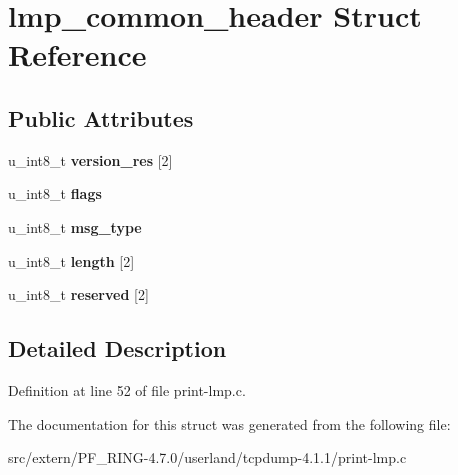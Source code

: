 \hypertarget{structlmp__common__header}{
\section{lmp\_\-common\_\-header Struct Reference}
\label{structlmp__common__header}
}
\subsection*{Public Attributes}
\begin{DoxyCompactItemize}
\item 
\hypertarget{structlmp__common__header_acb55bc0dc1d9bd10a6d7f7069c54d67e}{
u\_\-int8\_\-t {\bfseries version\_\-res} \mbox{[}2\mbox{]}}
\label{structlmp__common__header_acb55bc0dc1d9bd10a6d7f7069c54d67e}

\item 
\hypertarget{structlmp__common__header_a672053ea855df8ec17ee91e867cd74e0}{
u\_\-int8\_\-t {\bfseries flags}}
\label{structlmp__common__header_a672053ea855df8ec17ee91e867cd74e0}

\item 
\hypertarget{structlmp__common__header_ae14d97792028694c6b10624fd1d1ad94}{
u\_\-int8\_\-t {\bfseries msg\_\-type}}
\label{structlmp__common__header_ae14d97792028694c6b10624fd1d1ad94}

\item 
\hypertarget{structlmp__common__header_a8296b9548625654fc59a4c48566d6590}{
u\_\-int8\_\-t {\bfseries length} \mbox{[}2\mbox{]}}
\label{structlmp__common__header_a8296b9548625654fc59a4c48566d6590}

\item 
\hypertarget{structlmp__common__header_a338b989e4db0fb70d83065ca9fdeceb5}{
u\_\-int8\_\-t {\bfseries reserved} \mbox{[}2\mbox{]}}
\label{structlmp__common__header_a338b989e4db0fb70d83065ca9fdeceb5}

\end{DoxyCompactItemize}


\subsection{Detailed Description}


Definition at line 52 of file print-\/lmp.c.



The documentation for this struct was generated from the following file:\begin{DoxyCompactItemize}
\item 
src/extern/PF\_\-RING-\/4.7.0/userland/tcpdump-\/4.1.1/print-\/lmp.c\end{DoxyCompactItemize}

